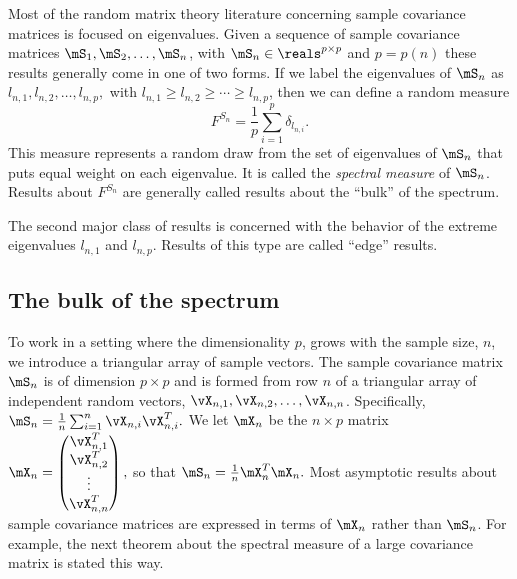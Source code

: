Most of the random matrix theory literature concerning sample covariance matrices is focused on eigenvalues.  Given a sequence of sample covariance matrices $\mS_1, \mS_2, \ldots, \mS_n$, with $\mS_n \in \reals^{p\times p}$ and $p = p(n)$ these results generally come in one of two forms.  If we label the eigenvalues of $\mS_n$ as
\(
    l_{n,1}, l_{n,2}, \ldots, l_{n,p},
\)
with $l_{n,1} \geq l_{n,2} \geq \cdots \geq l_{n,p}$, then we can define
a random measure
\[
    F^{S_n} = \frac{1}{p} \sum_{i=1}^p \delta_{l_{n,i}}.
\]
This measure represents a random draw from the set of eigenvalues of $\mS_n$ that puts equal weight on each eigenvalue.  It is called the \emph{spectral measure} of $\mS_n$.  Results about $F^{S_n}$ are generally called results about the ``bulk'' of the spectrum.  

The second major class of results is concerned with the behavior of the
extreme eigenvalues $l_{n,1}$ and $l_{n,p}$. Results of this type are called
``edge'' results.

\subsection{The bulk of the spectrum}

To work in a setting where the dimensionality $p$, grows with the sample size, $n$, we introduce a triangular array of sample vectors.  The sample covariance matrix $\mS_n$ is of dimension $p\times p$ and is formed from row $n$ of a triangular array of independent random vectors,  
$\vX_{n,1}, \vX_{n,2}, \ldots, \vX_{n,n}$.  Specifically,
\(
    \mS_n
    =
    \frac{1}{n}
    \sum_{i=1}^n \vX_{n,i} \vX_{n,i}^T.
\)
We let $\mX_n$ be the $n \times p$ matrix
\(
    \mX_n
    =
    \left(
    \begin{matrix}
        \vX_{n,1}^T \\
        \vX_{n,2}^T \\
        \vdots \\
        \vX_{n,n}^T
    \end{matrix}
    \right),
\)
so that 
\(
    \mS_n
    =
    \frac{1}{n}
    \mX_n^T \mX_n.
\)
Most asymptotic results about sample covariance matrices are expressed in terms of $\mX_n$ rather than $\mS_n$.  For example, the next theorem about the spectral measure of a large covariance matrix is stated this way.

